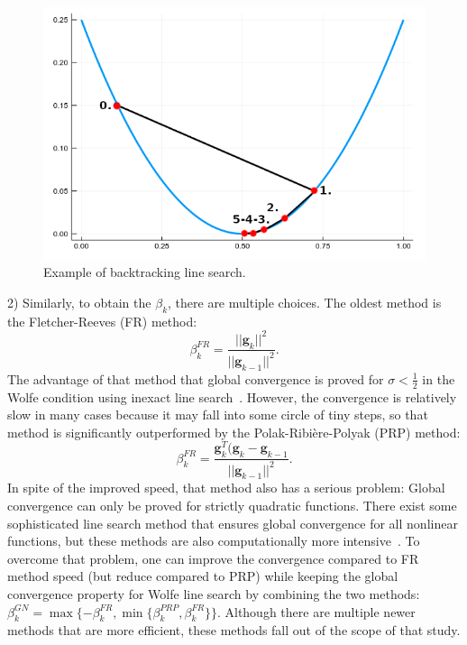 \begin{figure}
    \centering
    \includegraphics[width=0.3\linewidth]{images/project with Wiem/backtracking.png}
    \caption{Example of backtracking line search.}
    \label{fig:backtracking}
\end{figure}

2) Similarly, to obtain the $\beta_k$, there are multiple choices. The oldest method is the Fletcher-Reeves (FR) method:
$$\beta_k^{FR} = \frac{||\mathbf{g}_k||^2}{||\mathbf{g}_{k-1}||^2}.$$
The advantage of that method that global convergence is proved for $\sigma < \frac{1}{2}$ in the Wolfe condition using inexact line search~\cite{Al-Baali}. However, the convergence is relatively slow in many cases because it may fall into some circle of tiny steps, so that method is significantly outperformed by the Polak-Ribi\`{e}re-Polyak (PRP) method:
$$\beta_k^{FR} = \frac{\mathbf{g}_k^T (\mathbf{g}_k - \mathbf{g}_{k-1}}{||\mathbf{g}_{k-1}||^2}.$$
In spite of the improved speed, that method also has a serious problem: Global convergence can only be proved for strictly quadratic functions. There exist some sophisticated line search method that ensures global convergence for all nonlinear functions, but these methods are also computationally more intensive~\cite{grippo}.
To overcome that problem, one can improve the convergence compared to FR method speed (but reduce compared to PRP) while keeping the global convergence property for Wolfe line search by combining the two methods: $\beta_k^{GN} = \max\{-\beta_k^{FR}, \min\{\beta_k^{PRP},\beta_k^{FR}\}\}.$
Although there are multiple newer methods that are more efficient, these methods fall out of the scope of that study.

